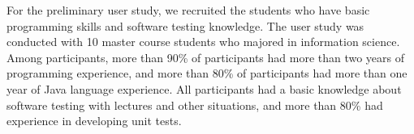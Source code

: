 \documentclass[conference]{IEEEtran}
\begin{document}



For the preliminary user study, we recruited the students who have basic programming skills and software testing knowledge. The user study was conducted with 10 master course students who majored in information science. Among participants, more than 90\% of participants had more than two years of programming experience, and more than 80\% of participants had more than one year of Java language experience. All participants had a basic knowledge about software testing with lectures  and other situations, and more than 80\% had experience in developing unit tests.


\end{document}
